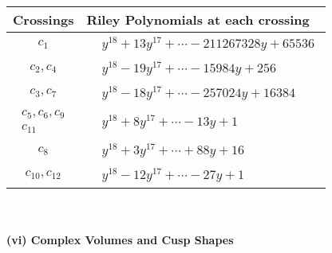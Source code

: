\documentclass[1p]{elsarticle_modified}
\theoremstyle{definition}
\begin{document}
\begin{tabular}{m{50pt}|m{274pt}}
Crossings & \hspace{64pt}Riley Polynomials at each crossing \\
\hline $$\begin{aligned}c_{1}\end{aligned}$$&$\begin{aligned}
&y^{18}+13 y^{17}+\cdots-211267328 y+65536
\end{aligned}$\\
\hline $$\begin{aligned}c_{2},c_{4}\end{aligned}$$&$\begin{aligned}
&y^{18}-19 y^{17}+\cdots-15984 y+256
\end{aligned}$\\
\hline $$\begin{aligned}c_{3},c_{7}\end{aligned}$$&$\begin{aligned}
&y^{18}-18 y^{17}+\cdots-257024 y+16384
\end{aligned}$\\
\hline $$\begin{aligned}c_{5},c_{6},c_{9}\\c_{11}\end{aligned}$$&$\begin{aligned}
&y^{18}+8 y^{17}+\cdots-13 y+1
\end{aligned}$\\
\hline $$\begin{aligned}c_{8}\end{aligned}$$&$\begin{aligned}
&y^{18}+3 y^{17}+\cdots+88 y+16
\end{aligned}$\\
\hline $$\begin{aligned}c_{10},c_{12}\end{aligned}$$&$\begin{aligned}
&y^{18}-12 y^{17}+\cdots-27 y+1
\end{aligned}$\\
\hline
\end{tabular}\\~\\
\newpage\flushleft \textbf{(vi) Complex Volumes and Cusp Shapes}
\end{document}
